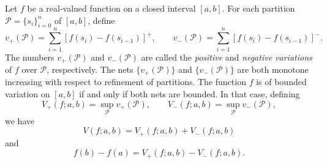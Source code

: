 Let $f$ be a real-valued function on a closed interval $[a, b]$. For each partition $\mathcal{P} = \{s_i\}_{i=0}^n$ of $[a, b]$, define
$$
v_+(\mathcal{P}) = \sum_{i=1}^n [f(s_i) - f(s_{i-1})]^+, \qquad
v_-(\mathcal{P}) = \sum_{i=1}^n [f(s_i) - f(s_{i-1})]^-.
$$
The numbers $v_+(\mathcal{P})$ and $v_-(\mathcal{P})$ are called the \textit{positive} and \textit{negative variations} of $f$ over $\mathcal{P}$, respectively. The nets $\{v_+(\mathcal{P})\}$ and $\{v_-(\mathcal{P})\}$ are both monotone increasing with respect to refinement of partitions. The function $f$ is of bounded variation on $[a, b]$ if and only if both nets are bounded. In that case, defining
$$
V_+(f; a, b) = \sup_{\mathcal{P}} v_+(\mathcal{P}), \qquad
V_-(f; a, b) = \sup_{\mathcal{P}} v_-(\mathcal{P}),
$$
we have
$$
V(f; a, b) = V_+(f; a, b) + V_-(f; a, b)
$$
and
$$
f(b) - f(a) = V_+(f; a, b) - V_-(f; a, b).
$$
